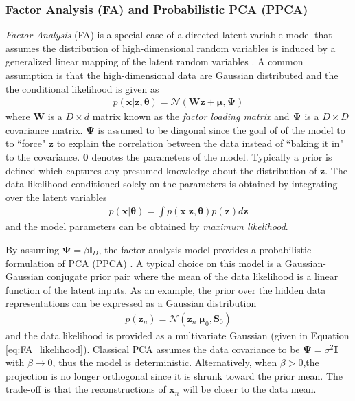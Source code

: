 \subsubsection{Factor Analysis (FA) and Probabilistic PCA (PPCA)} \label{sec:FA_and_PPCA}

\textit{Factor Analysis} (FA) is a special case of a directed latent variable model that assumes the distribution of high-dimensional random variables is induced by a generalized linear mapping of the latent random variables \citep{Murphy2012, Tipping1999PPCA, Rish2008SupDimRedGLM, Gonen2013BayesianSupDimRed}.  A common assumption is that the high-dimensional data are Gaussian distributed and the the conditional likelihood is given as
\begin{align} \label{eq:FA_likelihood}
	p(\bm{x}|\bm{z},\bm{\theta}) = \mathcal{N}(\bm{W}\bm{z} + \bm{\mu}, \bm{\Psi})
\end{align}
\noindent
where $\bm{W}$ is a $D \times d$ matrix known as the \textit{factor loading matrix} and $\bm{\Psi}$ is a $D \times D$ covariance matrix.  $\bm{\Psi}$ is assumed to be diagonal since the goal of of the model to to ``force" $\bm{z}$ to explain the correlation between the data instead of ``baking it in" to the covariance. $\bm{\theta}$ denotes the parameters of the model. Typically a prior is defined which captures any presumed knowledge about the distribution of $\bm{z}$.  The data likelihood conditioned solely on the parameters is obtained by integrating over the latent variables
\begin{align}
	p(\bm{x}|\bm{\theta}) = \int p(\bm{x}|\bm{z},\bm{\theta}) p(\bm{z}) d \bm{z}
\end{align}
\noindent
and the model parameters can be obtained by \textit{maximum likelihood}.


By assuming $\bm{\Psi} = \beta \mathbb{I}_{D}$, the factor analysis model provides a probabilistic formulation of PCA (PPCA) \citep{Tipping1999PPCA}.  A typical choice on this model is a Gaussian-Gaussian conjugate prior pair where the mean of the data likelihood is a linear function of the latent inputs.  As an example, the prior over the hidden data representations can be expressed as a Gaussian distribution
\begin{align}
p(\bm{z}_n) = \mathcal{N}(\bm{z}_n|\bm{\mu}_0, \bm{S}_0)
\end{align}
\noindent
and the data likelihood is provided as a multivariate Gaussian (given in Equation \ref{eq:FA_likelihood}).  Classical PCA assumes the data covariance to be $\bm{\Psi} = \sigma^2\bm{I}$ with $\beta \rightarrow 0$, thus the model is deterministic.  Alternatively, when $\beta > 0$,the projection is no longer orthogonal since it is shrunk toward the prior mean.  The trade-off is that the reconstructions of $\bm{x}_{n}$ will be closer to the data mean.


